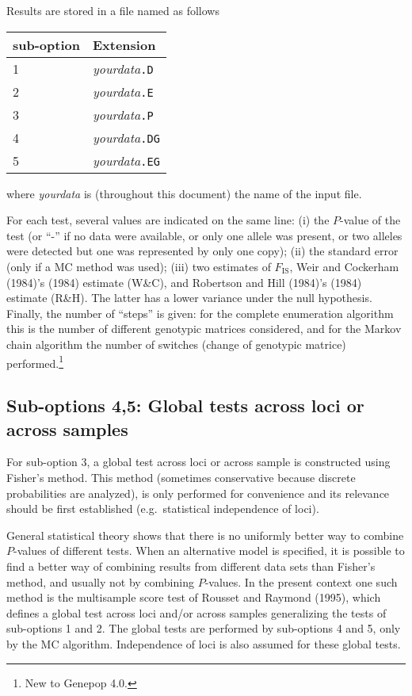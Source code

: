 \documentclass[12pt,]{book}
\let\rmarkdownfootnote\footnote%
\def\footnote{\protect\rmarkdownfootnote}
\theoremstyle{definition}
\theoremstyle{definition}
\theoremstyle{definition}
\theoremstyle{remark}
\begin{document}
Results are stored in a file named as follows

\begin{longtable}[]{@{}ll@{}}
\toprule
sub-option & Extension\tabularnewline
\midrule
\endhead
1 & \emph{yourdata}\texttt{.D}\tabularnewline
2 & \emph{yourdata}\texttt{.E}\tabularnewline
3 & \emph{yourdata}\texttt{.P}\tabularnewline
4 & \emph{yourdata}\texttt{.DG}\tabularnewline
5 & \emph{yourdata}\texttt{.EG}\tabularnewline
\bottomrule
\end{longtable}

where \emph{yourdata} is (throughout this document) the name of the
input file.

For each test, several values are indicated on the same line: (i) the
\(P\)-value of the test (or ``-'' if no data were available, or only one
allele was present, or two alleles were detected but one was represented
by only one copy); (ii) the standard error (only if a MC method was
used); (iii) two estimates of \(F_\mathrm{IS}\), Weir and Cockerham
(1984)'s (1984) estimate (W\&C), and Robertson and Hill (1984)'s (1984)
estimate (R\&H). The latter has a lower variance under the null
hypothesis. Finally, the number of ``steps'' is given: for the complete
enumeration algorithm this is the number of different genotypic matrices
considered, and for the Markov chain algorithm the number of
switches (change of genotypic
matrice) performed.\footnote{New to Genepop 4.0.}

\subsection{Sub-options 4,5: Global tests across loci or across
samples}\label{sub-options-45-global-tests-across-loci-or-across-samples}

For sub-option 3, a global test across loci or across sample is
constructed using Fisher's method.
This method (sometimes conservative because discrete probabilities are
analyzed), is only performed for convenience and its relevance should be
first established (e.g.~statistical independence of loci).

General statistical theory shows that there is no uniformly better way
to combine \(P\)-values of different tests. When an alternative model is
specified, it is possible to find a better way of combining results from
different data sets than Fisher's method, and usually not by combining
\(P\)-values. In the present context one such method is the multisample
score test of
Rousset and Raymond (1995), which defines a global test across loci
and/or across samples generalizing the tests of sub-options 1 and 2. The
global tests are performed by sub-options 4 and 5, only by the MC
algorithm. Independence of loci is also assumed for these global tests.
\end{document}
